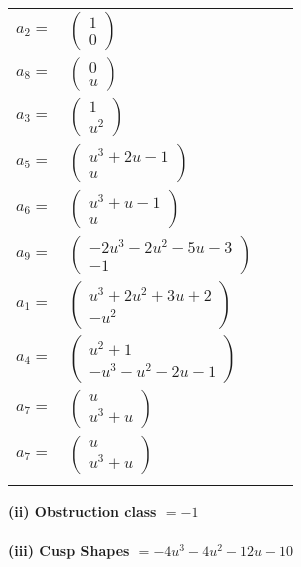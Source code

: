 \documentclass[1p]{elsarticle_modified}
\theoremstyle{definition}
\begin{document}
\begin{tabular}{m{7pt} m{180pt} m{7pt} m{180pt} }
\flushright $a_{2}=$&$\begin{pmatrix}1\\0\end{pmatrix}$ \\
\flushright $a_{8}=$&$\begin{pmatrix}0\\u\end{pmatrix}$ \\
\flushright $a_{3}=$&$\begin{pmatrix}1\\u^2\end{pmatrix}$ \\
\flushright $a_{5}=$&$\begin{pmatrix}u^3+2 u-1\\u\end{pmatrix}$ \\
\flushright $a_{6}=$&$\begin{pmatrix}u^3+u-1\\u\end{pmatrix}$ \\
\flushright $a_{9}=$&$\begin{pmatrix}-2 u^3-2 u^2-5 u-3\\-1\end{pmatrix}$ \\
\flushright $a_{1}=$&$\begin{pmatrix}u^3+2 u^2+3 u+2\\- u^2\end{pmatrix}$ \\
\flushright $a_{4}=$&$\begin{pmatrix}u^2+1\\- u^3- u^2-2 u-1\end{pmatrix}$ \\
\flushright $a_{7}=$&$\begin{pmatrix}u\\u^3+u\end{pmatrix}$\\ \flushright $a_{7}=$&$\begin{pmatrix}u\\u^3+u\end{pmatrix}$\\&\end{tabular}
\flushleft \textbf{(ii) Obstruction class $= -1$}\\~\\
\flushleft \textbf{(iii) Cusp Shapes $= -4 u^3-4 u^2-12 u-10$}\\~\\
\end{document}
